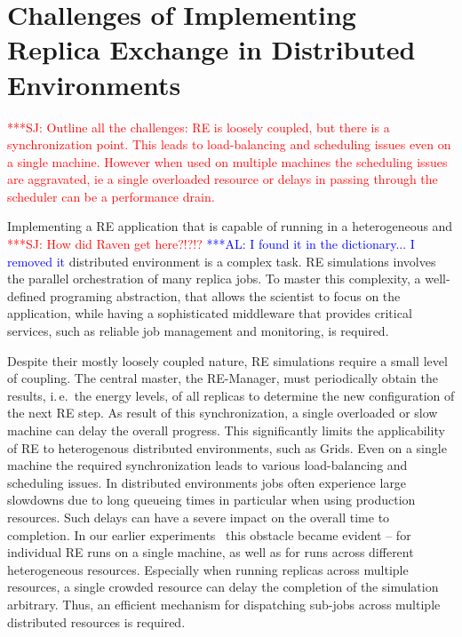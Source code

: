 \documentclass{rspublic}
\newcommand{\alnote}[1]{ {\textcolor{blue} { ***AL: #1 }}}
\newcommand{\jhanote}[1]{ {\textcolor{red} { ***SJ: #1 }}}
\newcommand{\alnote}[1]{}
\newcommand{\jhanote}[1]{}
\begin{document}

\section{Challenges of Implementing Replica Exchange in Distributed
  Environments}
\label{sec:challenges}
\jhanote{Outline all the challenges: RE is loosely coupled, but there
  is a synchronization point. This leads to load-balancing and
  scheduling issues even on a single machine. However when used on
  multiple machines the scheduling issues are aggravated, ie a single
  overloaded resource or delays in passing through the scheduler can
  be a performance drain.}                
                                               

Implementing a RE application that is capable of running in a
heterogeneous and  \jhanote{How did Raven get here?!?!?}
\alnote{I found it in the dictionary... I removed it}
distributed environment is a complex task. RE simulations involves the parallel
orchestration of many replica jobs. To master this complexity, a
well-defined programing abstraction, that allows the scientist to
focus on the application, while having a sophisticated middleware that
provides critical services, such as reliable job management and
monitoring, is required.

Despite their mostly loosely coupled nature, RE simulations require
a small level of coupling.  The central master, the RE-Manager, must
periodically obtain the results, i.\,e.\ the energy levels, of all
replicas to determine the new configuration of the next RE step.  As
result of this synchronization, a single overloaded or slow machine
can delay the overall progress. This significantly limits the
applicability of RE to heterogenous distributed environments, such
as Grids.  Even on a single machine the required synchronization leads
to various load-balancing and scheduling issues. In distributed
environments jobs often experience large slowdowns due to
long queueing times in particular when using production resources. 
Such delays can have a severe impact on the overall time to
completion.                                                    
In our earlier experiments~\citep{Luckow:2008la} this obstacle  
became evident -- for individual RE runs on a single machine, 
as well as for runs across different heterogeneous resources.
Especially when running replicas across multiple resources, 
a single crowded resource can delay the completion of the simulation arbitrary. 
Thus, an efficient
mechanism for dispatching sub-jobs across multiple distributed resources
is required.
\end{document}
